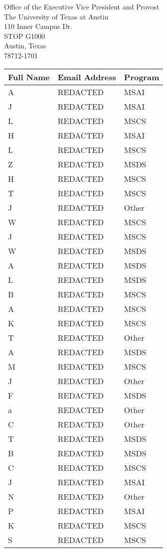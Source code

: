 \documentclass[11pt]{letter}
\begin{document}
\begin{letter}{Office of the Executive Vice President and Provost \\ The University of Texas at Austin \\ 110 Inner Campus Dr. \\ STOP G1000 \\ Austin, Texas \\ 78712-1701}
\begin{tabular}{|p{5cm}|p{6.7cm}|p{2.25cm}|}
        \textbf{Full Name} & \textbf{Email Address} & \textbf{Program} \\ \hline
        A & REDACTED & MSAI \\ \hline
        J & REDACTED & MSAI \\ \hline
        L & REDACTED & MSCS \\ \hline
        H & REDACTED & MSAI \\ \hline
        L & REDACTED & MSCS \\ \hline
        Z & REDACTED & MSDS \\ \hline
        H & REDACTED & MSCS \\ \hline
        T & REDACTED & MSCS \\ \hline
        J & REDACTED & Other \\ \hline
        W & REDACTED & MSCS \\ \hline
        J & REDACTED & MSCS \\ \hline
        W & REDACTED & MSDS \\ \hline
        A & REDACTED & MSDS \\ \hline
        L & REDACTED & MSDS \\ \hline
        B & REDACTED & MSCS \\ \hline
        A & REDACTED & MSCS \\ \hline
        K & REDACTED & MSCS \\ \hline
        T & REDACTED & Other \\ \hline
        A & REDACTED & MSDS \\ \hline
        M & REDACTED & MSCS \\ \hline
        J & REDACTED & Other \\ \hline
        F & REDACTED & MSDS \\ \hline
        a & REDACTED & Other \\ \hline
        C & REDACTED & Other \\ \hline
        T & REDACTED & MSDS \\ \hline
        B & REDACTED & MSDS \\ \hline
        C & REDACTED & MSCS \\ \hline
        J & REDACTED & MSAI \\ \hline
        N & REDACTED & Other \\ \hline
        P & REDACTED & MSAI \\ \hline
        K & REDACTED & MSCS \\ \hline
        S & REDACTED & MSCS \\ \hline

\end{tabular}
\end{letter}
\end{document}
